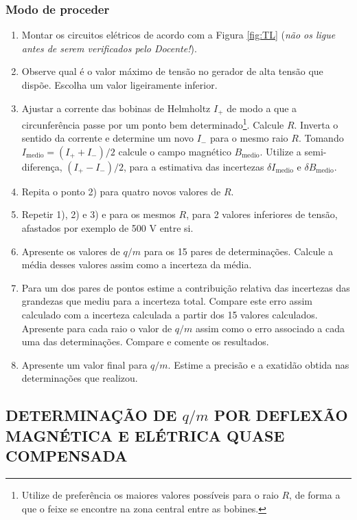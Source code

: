 \documentclass[a4paper,twoside,12pt]{article}      %
\begin{document}
\subsubsection{\sf Modo de proceder}


\begin{enumerate}
	\item Montar os circuitos elétricos de acordo com a  Figura \ref{fig:TL} 
	(\emph{não os ligue antes de serem verificados pelo Docente!}).
	\item Observe qual é o valor máximo de tensão no gerador de  alta tensão que dispõe. Escolha um valor ligeiramente inferior.
	\item Ajustar a corrente das bobinas de Helmholtz $I_+$ de modo a que a circunferência passe por um ponto bem determinado\footnote{Utilize de preferência os maiores valores possíveis para o raio $R$, de forma a que o feixe se encontre na zona central entre as bobines.}.  Calcule $R$.
	Inverta o sentido da corrente e determine um novo $I_-$ para o mesmo raio $R$.
	Tomando $I_{\textrm{medio}} = (I_+ + I_-)/2 $ calcule o campo magnético $B_{\textrm{medio}}$. Utilize a semi-diferença, $(I_+ - I_-)/2$, para a estimativa das incertezas $\delta I_{\textrm{medio}}$ e $\delta B_{\textrm{medio}}$.
	\item Repita o ponto 2) para quatro novos valores de $R$. 
	\item Repetir 1), 2) e 3)  e para os mesmos $R$, para 2 valores inferiores de tensão, afastados por exemplo de 500 V entre si.
	\item Apresente os valores de $q/m$ para os 15 pares de determinações. Calcule a média desses valores assim como a incerteza da média.
	\item Para um dos pares de pontos estime a contribuição relativa das incertezas das grandezas que mediu para a incerteza total. Compare este erro assim calculado com a incerteza calculada a partir dos 15 valores calculados.
	Apresente para cada raio o valor de $q/m$ assim como o erro associado a cada uma das determinações. Compare e comente os resultados.
	\item Apresente um valor final para $q/m$. Estime a precisão e a exatidão obtida nas determinações que realizou.
\end{enumerate}
 
\subsection{\sf DETERMINAÇÃO DE $q/m$ POR DEFLEXÃO\\ MAGNÉTICA E ELÉTRICA QUASE COMPENSADA }
\end{document}
